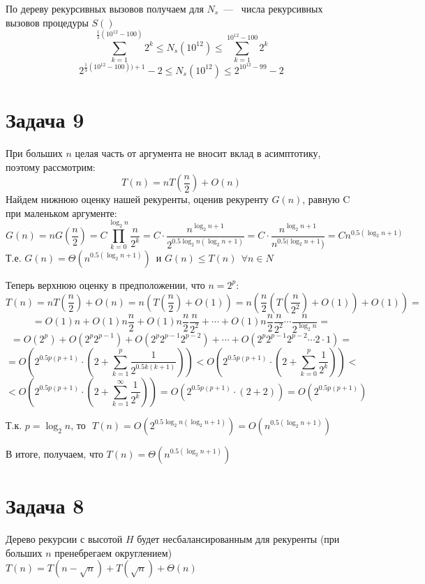 \documentclass[a4paper,12pt]{article} %
\begin{document}
По дереву рекурсивных вызовов получаем для $N_s$~---~
числа рекурсивных вызовов процедуры $S()$
\[
	\sum_{k=1}^{\frac{1}{3}(10^{12}-100)}{2^k} \leq N_s(10^{12}) \leq \sum_{k=1}^{10^{12}-100}{2^k} 
\]
\[
	2^{\frac{1}{3}(10^{12}-100))+1}-2 \leq N_s(10^{12}) \leq 2^{10^{12}-99}-2
\]

\section*{Задача 9}
При больших $n$ целая часть от аргумента не вносит вклад в асимптотику, поэтому рассмотрим:
\[
T(n) = nT\left(\frac{n}{2}\right) + O(n)
\]
Найдем нижнюю оценку нашей рекуренты, оценив рекуренту $G(n)$, равную C при маленьком аргументе:
\[
	G(n) = nG\left(\dfrac{n}{2}\right) =C\prod_{k=0}^{\log_{2}{n}}{\dfrac{n}{2^k}} = C\cdot \dfrac{n^{\log_{2}{n}+1}}{2^{0.5\log_{2}{n}(\log_{2}{n}+1)}} = C \cdot \dfrac{n^{\log_{2}{n}+1}}{n^{0.5(\log_{2}{n}+1})} = Cn^{0.5(\log_{2}{n}+1)}\]
	Т.е. $G(n)=  \Theta(n^{0.5(\log_{2}{n}+1)})
$~и $G(n) \leq T(n)~~\forall n \in N$

Теперь верхнюю оценку в предположении, что $n = 2^p$:
\[
	T(n) = nT\left(\dfrac{n}{2}\right)  + O(n)=n\left(T\left(\dfrac{n}{2}\right)  + O(1)\right) = n\left(\dfrac{n}{2}\left(T\left(\dfrac{n}{2^2}\right)  + O(1)\right)  + O(1)\right)=
\]
\[
	= O(1)n+ O(1)n\dfrac{n}{2}+O(1)n\dfrac{n}{2}\dfrac{n}{2^2}+\cdots + O(1)n\dfrac{n}{2}\dfrac{n}{2^2}\cdots\dfrac{n}{2^{\log_{2}{n}}} = \]
\[=O(2^p) + O(2^p2^{p-1})+ O(2^p2^{p-1}2^{p-2})+\cdots+O(2^p2^{p-1}2^{p-2}\cdots2\cdot1)=
\]
\[
	= O\left( 2^{0.5p(p+1)}\cdot \left( 2 + \sum_{k=1}^{p}{\dfrac{1}{2^{0.5k(k+1)}}} \right) \right) < O\left( 2^{0.5p(p+1)}\cdot \left( 2 + \sum_{k=0}^{p}{\dfrac{1}{2^{k}}} \right) \right)<
\]
\[
	< O\left( 2^{0.5p(p+1)}\cdot \left( 2 + \sum_{k=1}^{\infty}{\dfrac{1}{2^{k}}} \right) \right) = O\left( 2^{0.5p(p+1)}\cdot ( 2 + 2 )\right) = O(2^{0.5p(p+1)}) 
\]

Т.к. $p = \log_{2}{n}\text{,~то~~} T(n) = O(2^{0.5\log_{2}{n}(\log_{2}{n}+1)}) = O(n^{0.5(\log_{2}{n}+1)})$

В итоге, получаем, что $T(n)  = \Theta(n^{0.5(\log_{2}{n}+1)})$

\section*{Задача 8}

Дерево рекурсии с высотой $H$ будет несбалансированным для рекуренты (при больших $n$ пренебрегаем округлением)\\
 $T(n) = T(n - \sqrt{n}) + T(\sqrt{n}) + \Theta(n)$\\
 
\end{document}
